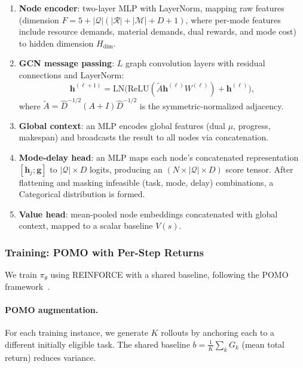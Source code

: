 \documentclass[11pt]{article}
\newcommand{\calM}{\mathcal{M}}
\newcommand{\calR}{\mathcal{R}}
\newcommand{\calQ}{\mathcal{Q}}
\begin{document}
\begin{enumerate}
    \item \textbf{Node encoder}: two-layer MLP with LayerNorm, mapping raw features (dimension $F = 5 + |\calQ|(|\calR| + |\calM| + D + 1)$, where per-mode features include resource demands, material demands, dual rewards, and mode cost) to hidden dimension $H_{\text{dim}}$.
    \item \textbf{GCN message passing}: $L$ graph convolution layers with residual connections and LayerNorm:
    \begin{equation}
        \bm{h}^{(\ell+1)} = \text{LN}\bigl(\text{ReLU}(\tilde{A} \bm{h}^{(\ell)} W^{(\ell)}) + \bm{h}^{(\ell)}\bigr),
    \end{equation}
    where $\tilde{A} = \hat{D}^{-1/2}(A + I)\hat{D}^{-1/2}$ is the symmetric-normalized adjacency.
    \item \textbf{Global context}: an MLP encodes global features (dual $\mu$, progress, makespan) and broadcasts the result to all nodes via concatenation.
    \item \textbf{Mode-delay head}: an MLP maps each node's concatenated representation $[\bm{h}_j; \bm{g}]$ to $|\calQ| \times D$ logits, producing an $(N \times |\calQ| \times D)$ score tensor.
    After flattening and masking infeasible (task, mode, delay) combinations, a Categorical distribution is formed.
    \item \textbf{Value head}: mean-pooled node embeddings concatenated with global context, mapped to a scalar baseline $V(s)$.
\end{enumerate}

\subsubsection{Training: POMO with Per-Step Returns}

We train $\pi_\theta$ using REINFORCE with a shared baseline, following the POMO framework~\citep{kwon2020pomo}.

\paragraph{POMO augmentation.}
For each training instance, we generate $K$ rollouts by anchoring each to a different initially eligible task.
The shared baseline $b = \frac{1}{K}\sum_k G_k$ (mean total return) reduces variance.
\end{document}
